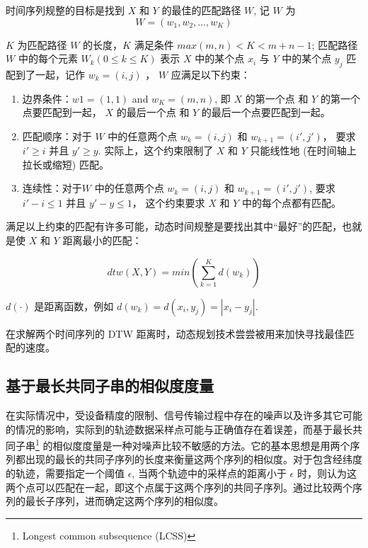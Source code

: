 时间序列规整的目标是找到 $X$ 和 $Y$ 的最佳的匹配路径 $W$, 记 $W$ 为
\begin{equation}
\label{DTWpath}
W = (w_1, w_2, \ldots, w_K)
\end{equation}

$K$ 为匹配路径 $W$ 的长度，$K$ 满足条件 $max(m,n) < K < m+n-1$; 匹配路径 $W$ 中的每个元素 $W_k (0\leq k \leq K)$ 表示 $X$ 中的某个点 $x_i$ 与 $Y$ 中的某个点 $y_j$ 匹配到了一起，记作 $w_k=(i,j)$ ， $W$ 应满足以下约束：
\begin{enumerate}
\vspace{1mm}
\item 边界条件：$w1 = (1, 1)$ and $w_K = (m, n)$, 即 $X$ 的第一个点 和 $Y$ 的第一个点要匹配到一起， $X$ 的最后一个点 和 $Y$ 的最后一个点要匹配到一起。
\item 匹配顺序：对于 $W$ 中的任意两个点 $w_k = (i, j)$ 和 $w_{k+1} = (i', j')$， 要求 $i' \ge i$ 并且 $y' \ge y$. 实际上，这个约束限制了 $X$ 和 $Y$ 只能线性地 (在时间轴上拉长或缩短) 匹配。
\item 连续性：对于$W$ 中的任意两个点 $w_k = (i, j)$ 和 $w_{k+1} = (i', j')$, 要求 $i' - i \le 1$ 并且 $y' - y \le 1$， 这个约束要求 $X$ 和 $Y$ 中的每个点都有匹配。
\vspace{1mm}
\end{enumerate}

满足以上约束的匹配有许多可能，动态时间规整是要找出其中``最好''的匹配，也就是使 $X$ 和 $Y$ 距离最小的匹配：

\begin{equation}
dtw(X, Y) = min( \sum_{k=1}^{K} d(w_k) )
\end{equation}

$d(\cdot)$ 是距离函数，例如 $d(w_k) = d(x_i,y_j) = |x_i-y_j|$. \par

在求解两个时间序列的 DTW 距离时，动态规划技术尝尝被用来加快寻找最佳匹配的速度。\par
\vspace{2mm}

\subsection{基于最长共同子串的相似度度量}
在实际情况中，受设备精度的限制、信号传输过程中存在的噪声以及许多其它可能的情况的影响，实际到的轨迹数据采样点可能与正确值存在着误差，而基于最长共同子串\footnote{Longest common subsequence (LCSS)} 的相似度度量是一种对噪声比较不敏感的方法。它的基本思想是用两个序列都出现的最长的共同子序列的长度来衡量这两个序列的相似度。对于包含经纬度的轨迹，需要指定一个阈值 $\epsilon$, 当两个轨迹中的采样点的距离小于 $\epsilon$ 时，则认为这两个点可以匹配在一起，即这个点属于这两个序列的共同子序列。通过比较两个序列的最长子序列，进而确定这两个序列的相似度。

